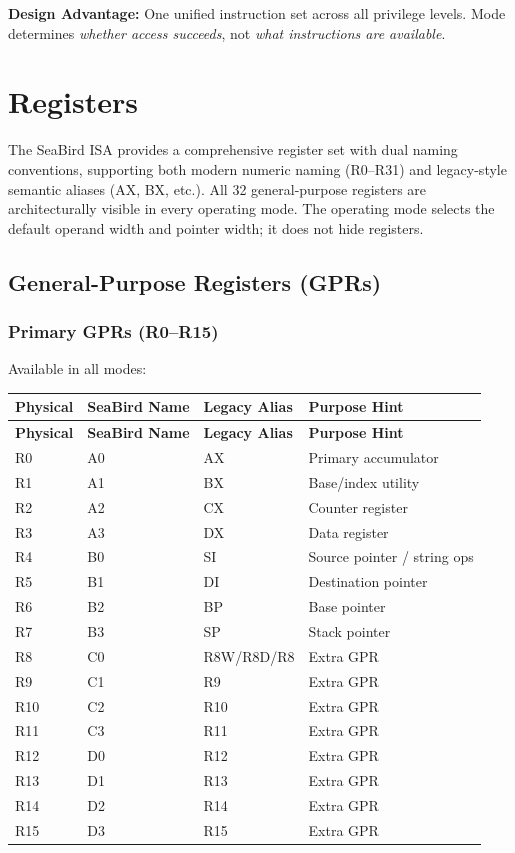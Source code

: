 \documentclass[11pt]{article}
\begin{document}
\textbf{Design Advantage:} One unified instruction set across all privilege levels. Mode determines \textit{whether access succeeds}, not \textit{what instructions are available}.

\section{Registers}

The SeaBird ISA provides a comprehensive register set with dual naming conventions, supporting both modern numeric naming (R0--R31) and legacy-style semantic aliases (AX, BX, etc.). All 32 general-purpose registers are architecturally visible in every operating mode. The operating mode selects the default operand width and pointer width; it does not hide registers.

\subsection{General-Purpose Registers (GPRs)}

\subsubsection{Primary GPRs (R0--R15)}

Available in all modes:

\begin{longtable}{@{}llll@{}}
\toprule
\textbf{Physical} & \textbf{SeaBird Name} & \textbf{Legacy Alias} & \textbf{Purpose Hint} \\ \midrule
\endfirsthead
\toprule
\textbf{Physical} & \textbf{SeaBird Name} & \textbf{Legacy Alias} & \textbf{Purpose Hint} \\ \midrule
\endhead
R0 & A0 & AX & Primary accumulator \\
R1 & A1 & BX & Base/index utility \\
R2 & A2 & CX & Counter register \\
R3 & A3 & DX & Data register \\
R4 & B0 & SI & Source pointer / string ops \\
R5 & B1 & DI & Destination pointer \\
R6 & B2 & BP & Base pointer \\
R7 & B3 & SP & Stack pointer \\
R8 & C0 & R8W/R8D/R8 & Extra GPR \\
R9 & C1 & R9 & Extra GPR \\
R10 & C2 & R10 & Extra GPR \\
R11 & C3 & R11 & Extra GPR \\
R12 & D0 & R12 & Extra GPR \\
R13 & D1 & R13 & Extra GPR \\
R14 & D2 & R14 & Extra GPR \\
R15 & D3 & R15 & Extra GPR \\ \bottomrule
\end{longtable}
\end{document}
